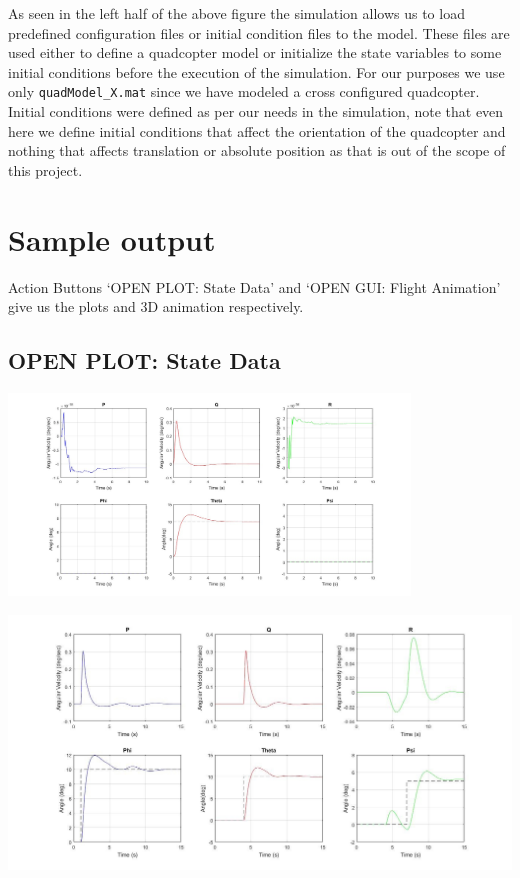 \documentclass[9pt]{article}
\begin{document}
\noindent As seen in the left half of the above figure the simulation allows us to load predefined configuration files or initial condition files to the model. These files are used either to define a quadcopter model or initialize the state variables to some initial conditions before the execution of the simulation. For our purposes we use only \texttt{quadModel\_X.mat} since we have modeled a cross configured quadcopter. Initial conditions were defined as per our needs in the simulation, note that even here we define initial conditions that affect the orientation of the quadcopter and nothing that affects translation or absolute position as that is out of the scope of this project.

\section{Sample output}
\noindent Action Buttons ‘OPEN PLOT: State Data’ and ‘OPEN GUI: Flight Animation’ give us the plots and $3$D animation respectively.

\subsection{OPEN PLOT: State Data}

\begin{center}
\includegraphics[width=0.8\textwidth]{14.jpg}
\end{center}

\begin{center}
\includegraphics[width=1.0\textwidth]{16.jpg}
\end{center}
\end{document}
